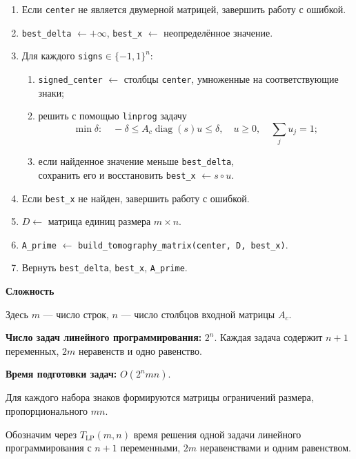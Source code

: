 \documentclass[12pt,a4paper]{article}
\numberwithin{equation}{section}
\newcommand{\theorypart}[1]{%
    \par\medskip
    \noindent\textbf{#1}\par\nopagebreak\smallskip
}
\begin{document}
\begin{enumerate}
    \setlength{\itemsep}{0.3\baselineskip}
    \item Если \texttt{center} не является двумерной матрицей,
    завершить работу с ошибкой.
    \item \texttt{best\_delta} $\gets +\infty$,
    \texttt{best\_x} $\gets$ неопределённое значение.
    \item Для каждого \texttt{signs}$\in\{-1,1\}^n$:
    \begin{enumerate}
        \item \texttt{signed\_center} $\gets$ столбцы \texttt{center},
        умноженные на соответствующие знаки;
        \item решить с помощью \texttt{linprog} задачу
        \[
            \min\delta:\quad
            -\delta\leq A_c\operatorname{diag}(s)u\leq\delta,
            \quad u\geq0,\quad \sum_j u_j=1;
        \]
        \item если найденное значение меньше \texttt{best\_delta},\\
        сохранить его и восстановить
        \texttt{best\_x} $\gets s\circ u$.
    \end{enumerate}
    \item Если \texttt{best\_x} не найден, завершить работу с ошибкой.
    \item $D\gets$ матрица единиц размера $m\times n$.
    \item \texttt{A\_prime} $\gets$
    \texttt{build\_tomography\_matrix(center, D, best\_x)}.
    \item Вернуть \texttt{best\_delta}, \texttt{best\_x},
    \texttt{A\_prime}.
\end{enumerate}

\theorypart{Сложность}

\noindent
Здесь $m$ --- число строк, $n$ --- число столбцов входной матрицы $A_c$.

\smallskip
\noindent
\textbf{Число задач линейного программирования:} $2^n$.
Каждая задача содержит $n+1$ переменных, $2m$ неравенств и одно
равенство.

\smallskip
\noindent
\textbf{Время подготовки задач:} $O(2^nmn)$.

\noindent
Для каждого набора знаков формируются матрицы ограничений размера,
пропорционального $mn$.

\smallskip
\noindent
Обозначим через $T_{\mathrm{LP}}(m,n)$ время решения одной задачи
линейного программирования с $n+1$ переменными, $2m$ неравенствами
и одним равенством.
\end{document}
